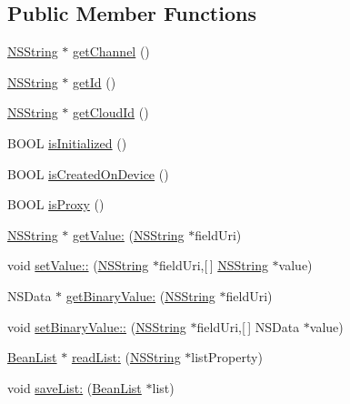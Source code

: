 \subsection*{\-Public \-Member \-Functions}
\begin{DoxyCompactItemize}
\item 
\hyperlink{class_n_s_string}{\-N\-S\-String} $\ast$ \hyperlink{interface_mobile_bean_ae44c212a23234c2d150f5b5308da06c0}{get\-Channel} ()
\item 
\hyperlink{class_n_s_string}{\-N\-S\-String} $\ast$ \hyperlink{interface_mobile_bean_a5b46efc0a2f36f7adacbb4110a12db9c}{get\-Id} ()
\item 
\hyperlink{class_n_s_string}{\-N\-S\-String} $\ast$ \hyperlink{interface_mobile_bean_a0f8fe95a97c391a12de36c2f72357a77}{get\-Cloud\-Id} ()
\item 
\-B\-O\-O\-L \hyperlink{interface_mobile_bean_adf324a1d195f07535650a2f9c4e72c2e}{is\-Initialized} ()
\item 
\-B\-O\-O\-L \hyperlink{interface_mobile_bean_a5ef8e84a0ccc61f65913e6e83dd1d907}{is\-Created\-On\-Device} ()
\item 
\-B\-O\-O\-L \hyperlink{interface_mobile_bean_a9c4154a3d86f842bb03cf4053d78bd40}{is\-Proxy} ()
\item 
\hyperlink{class_n_s_string}{\-N\-S\-String} $\ast$ \hyperlink{interface_mobile_bean_a5ac15c5323dd5de0be89a24be9d9bc4f}{get\-Value\-:} (\hyperlink{class_n_s_string}{\-N\-S\-String} $\ast$field\-Uri)
\item 
void \hyperlink{interface_mobile_bean_aa2e9dee169619a886bfbf64533fd4b10}{set\-Value\-::} (\hyperlink{class_n_s_string}{\-N\-S\-String} $\ast$field\-Uri,\mbox{[}$\,$\mbox{]} \hyperlink{class_n_s_string}{\-N\-S\-String} $\ast$value)
\item 
\-N\-S\-Data $\ast$ \hyperlink{interface_mobile_bean_a26cddbd6c474ad63e57251ea9aad6950}{get\-Binary\-Value\-:} (\hyperlink{class_n_s_string}{\-N\-S\-String} $\ast$field\-Uri)
\item 
void \hyperlink{interface_mobile_bean_a8a3f847eb9b5195056471188e0bd7c41}{set\-Binary\-Value\-::} (\hyperlink{class_n_s_string}{\-N\-S\-String} $\ast$field\-Uri,\mbox{[}$\,$\mbox{]} \-N\-S\-Data $\ast$value)
\item 
\hyperlink{interface_bean_list}{\-Bean\-List} $\ast$ \hyperlink{interface_mobile_bean_a1f36e2a5b9ecb363c38973df1618e237}{read\-List\-:} (\hyperlink{class_n_s_string}{\-N\-S\-String} $\ast$list\-Property)
\item 
void \hyperlink{interface_mobile_bean_af59eea7c76a2397dbe4e5c44a8cb5275}{save\-List\-:} (\hyperlink{interface_bean_list}{\-Bean\-List} $\ast$list)

\end{DoxyCompactItemize}
